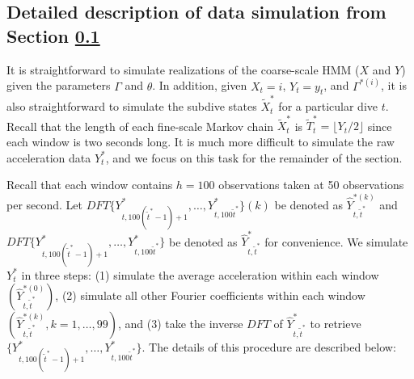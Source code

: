 
\subsection{Detailed description of data simulation from Section \ref{}}

It is straightforward to simulate realizations of the coarse-scale HMM ($X$ and $Y$) given the parameters $\Gamma$ and $\theta$. In addition, given $X_t = i$, $Y_t = y_t$, and $\Gamma^{*(i)}$, it is also straightforward to simulate the subdive states $\tilde{X}^*_t$ for a particular dive $t$. Recall that the length of each fine-scale Markov chain $\tilde{X}^*_t$ is $\tilde T^*_t = \lfloor Y_t/2 \rfloor$ since each window is two seconds long. It is much more difficult to simulate the raw acceleration data $Y_t^*$, and we focus on this task for the remainder of the section. 

Recall that each window contains $h = 100$ observations taken at 50 observations per second. Let $DFT\{Y^*_{t,100(\tilde t^* - 1) + 1},\ldots,Y^*_{t,100\tilde t^*}\}(k)$ be denoted as $\hat{Y}^{*(k)}_{t,\tilde t^*}$ and $DFT\{Y^*_{t,100(\tilde t^* - 1) + 1},\ldots,Y^*_{t,100\tilde t^*}\}$ be denoted as $\hat{Y}^*_{t,\tilde t^*}$ for convenience. We simulate $Y_t^*$ in three steps: (1) simulate the average acceleration within each window $\left(\hat Y^{*(0)}_{t,\tilde t^*}\right)$, (2) simulate all other Fourier coefficients within each window $\left(\hat Y^{*(k)}_{t,\tilde t^*}, k = 1,\ldots,99\right)$, and (3) take the inverse $DFT$ of $\hat{Y}^*_{t,\tilde t^*}$ to retrieve $\{Y^*_{t,100(\tilde t^* - 1) + 1},\ldots,Y^*_{t,100\tilde t^*}\}$. The details of this procedure are described below:

